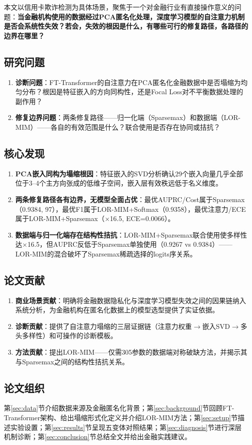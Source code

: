 本文以信用卡欺诈检测为具体场景，聚焦于一个对金融行业有直接操作意义的问题：\textbf{当金融机构使用的数据经过PCA匿名化处理，深度学习模型的自注意力机制是否会系统性失效？若会，失效的根因是什么，有哪些可行的修复路径，各路径的边界在哪里？}

\subsection{研究问题}

\begin{enumerate}
    \item \textbf{诊断问题}：FT-Transformer的自注意力在PCA匿名化金融数据中是否塌缩为均匀分布？根因是特征嵌入的方向同构性，还是Focal Loss对不平衡数据处理的副作用？
    \item \textbf{修复边界问题}：两条修复路径——归一化端（Sparsemax）和数据端（LOR-MIM）——各自的有效范围是什么？联合使用是否存在协同或拮抗？
\end{enumerate}

\subsection{核心发现}

\begin{enumerate}
    \item \textbf{PCA嵌入同构为塌缩根因}：特征嵌入的SVD分析确认29个嵌入向量几乎全部位于3--4个主方向张成的低维子空间，嵌入层有效秩远低于名义维度。
    \item \textbf{两条修复路径各有边界，无模型全面占优}：最优AUPRC/Cost属于Sparsemax（0.9384, 97），最优F1属于LOR-MIM+Softmax（0.9358），最优注意力/ECE属于LOR-MIM+Sparsemax（$\times$16.5, ECE=0.0066）。
    \item \textbf{数据端与归一化端存在结构性拮抗}：LOR-MIM+Sparsemax联合使用使多样性达$\times$16.5，但AUPRC反低于Sparsemax单独使用（0.9267 vs 0.9384）——LOR-MIM的混合破坏了Sparsemax稀疏选择的logits序关系。
\end{enumerate}

\subsection{论文贡献}

\begin{enumerate}
    \item \textbf{商业场景贡献}：明确将金融数据隐私化与深度学习模型失效之间的因果链纳入系统分析，为金融机构在匿名化数据上的模型选型提供了实证依据。
    \item \textbf{诊断贡献}：提供了自注意力塌缩的三层证据链（注意力权重$\to$嵌入SVD$\to$多头多样性）和可操作的诊断模板。
    \item \textbf{方法贡献}：提出LOR-MIM——仅需305参数的数据端对称破缺方法，并揭示其与Sparsemax之间的结构性拮抗关系。
\end{enumerate}

\subsection{论文组织}

第\ref{sec:data}节介绍数据来源及金融匿名化背景；第\ref{sec:background}节回顾FT-Transformer架构、给出塌缩形式化定义并介绍LOR-MIM方法；第\ref{sec:setup}节描述实验设置；第\ref{sec:results}节呈现五变体对照结果；第\ref{sec:diagnosis}节进行深层机制诊断；第\ref{sec:conclusion}节总结全文并给出金融实践建议。
